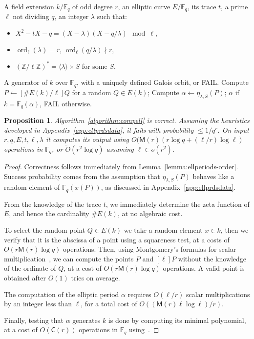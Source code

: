 \documentclass[12pt]{article}
\theoremstyle{plain}
\newtheorem{proposition}[theorem]{Proposition}
\theoremstyle{definition}
\newcommand{\tildO}{\tilde{O}}
\DeclareMathOperator{\order}{ord} %
\def\Z{\ensuremath{\mathbb{Z}}}
\def\F{\ensuremath{\mathbb{F}}}
\def\MM{\ensuremath{\mathsf{M}}}
\def\CC{\ensuremath{\mathsf{C}}}
\newcounter{algorithm}
\begin{document}
\begin{algorithm}
\label{algorithm:compell}
  \begin{algorithmic}[1]
    \REQUIRE A field extension $k/\F_q$ of odd degree $r$,
    an elliptic curve $E/\F_q$, its trace $t$, a prime $\ell$ not dividing $q$,
    an integer $\lambda$ such that:
    \begin{itemize}
    \item $X^2 - tX - q = (X-\lambda)(X-q/\lambda) \mod\ell$,
    \item $\order_\ell(\lambda)=r$, $\order_\ell(q/\lambda)\nmid r$,
    \item $(\Z/\ell\Z)^{\ast} = \langle{\lambda}\rangle \times S$ for some $S$.
    \end{itemize}
    \ENSURE A generator of $k$ over $\F_q$, with a uniquely defined Galois orbit, or FAIL.
    \REPEAT
    \STATE Compute $P\leftarrow[\# E(k)/\ell]Q$ for a random $Q\in E(k)$;
    \STATE Compute $\alpha\leftarrow\eta_{\lambda,S}(P)$;
    \RETURN $\alpha$ if $k=\F_q(\alpha)$, FAIL otherwise.
  \end{algorithmic}
\end{algorithm}

\begin{proposition}
  Algorithm~\ref{algorithm:compell} is correct. Assuming the
  heuristics developed in Appendix~\ref{app:ellprdsdata}, it fails
  with probability $\le 1/q^r$.  On input
  $r,q,E,t,\ell,\lambda$ it computes its output using
  $O(\MM(r)(r\log{q} + (\ell/r)\log{\ell})$ operations in $\F_q$, or
  $\tildO(r^2\log q)$ assuming $\ell\in o(r^2)$.
\end{proposition}
\begin{proof}
  Correctness follows immediately from
  Lemma~\ref{lemma:ellperiods-order}. Success probability comes from
  the assumption that $\eta_{\lambda,S}(P)$ behaves like a random element of
  $\F_q(x(P))$, as discussed in Appendix~\ref{app:ellprdsdata}.

  From the knowledge of the trace $t$, we immediately determine the
  zeta function of $E$, and hence the cardinality $\# E(k)$, at
  no algebraic cost.

  To select the random point $Q\in E(k)$ we take a random
  element $x\in k$, then we verify that it is the abscissa of a
  point using a squareness test, at a costs of $O(r\MM(r)\log q)$
  operations. Then, using Montgomery's formulas for scalar
  multiplication~\cite{montgomery}, we can compute the points $P$ and
  $[\ell]P$ without the knowledge of the ordinate of $Q$, at a cost of
  $O(r\MM(r)\log q)$ operations. A valid point is obtained after
  $O(1)$ tries on average.

  The computation of the elliptic period $\alpha$ requires $O(\ell/r)$ scalar
  multiplications by an integer less than $\ell$, for a total cost of
  $O((\MM(r)\ell\log\ell)/r)$.

  Finally, testing that $\alpha$ generates $k$ is done by computing
  its minimal polynomial, at a cost of $O(\CC(r))$ operations in
  $\F_q$ using~\cite{shoup93}.
\end{proof}
\end{document}
